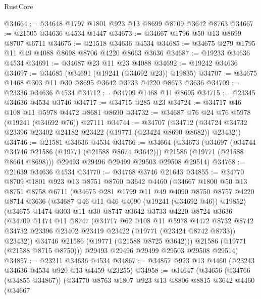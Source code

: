 \begin{lexlean}{RustCore}
\begin{coremodule}
@34664 := @34648 @1797 @1801 @923 @13 @8699 @8709 @3642 @8763
@34667 := @21505 @34636 @4534 @1447
@34673 := @34667 @1796 @50 @13 @8699 @8707 @6711
@34675 := @21518 @34636 @4534
@34685 := @34675 @279 @1795 @11 @49 @4088 @8698 @8706 @4220 @8663 @3636
@34687 := @19233 @34636 @4534
@34691 := @34687 @23 @11 @23 @4088
@34692 := @19242 @34636
@34697 := @34685 (@34691 (@19241 (@34692 @23)) @19835)
@34707 := @34675 @1468 @303 @11 @30 @8695 @3642 @3733 @4220 @8673 @3636
@34709 := @23336 @34636 @4534
@34712 := @34709 @1468 @11 @8695
@34715 := @23345 @34636 @4534 @3746
@34717 := @34715 @285 @23
@34724 := @34717 @46 @108 @11 @5978 @4472 @8681 @8690
@34732 := @34687 @76 @24 @76 @5978 (@19241 (@34692 @76)) @27111
@34744 := @34707
    (@34712 (@34724 @34732 @23396 @23402 @24182 @23422 (@19771 (@23424 @8690 @8682)) @23432))
@34746 := @21581 @34636 @4534
@34766 := @34664
    (@34673
      (@34697
        (@34744 @34746 @21586 (@19771 (@21588 @8674 @3642)))
        @21586
        (@19771 (@21588 @8664 @8698)))
      @29493
      @29496
      @29499
      @29503
      @29508
      @29514)
@34768 := @21639 @34636 @4534
@34770 := @34768 @3746 @21643
@34855 := @34770
    @8709
    @1801
    @923
    @13
    @8751
    @8760
    @3642
    @4460
    (@34667
      @1800
      @50
      @13
      @8751
      @8758
      @6711
      (@34675
        @281
        @1799
        @11
        @49
        @4090
        @8750
        @8757
        @4220
        @8714
        @3636
        (@34687 @46 @11 @46 @4090 (@19241 (@34692 @46)) @19852)
        (@34675
          @1474
          @303
          @11
          @30
          @8747
          @3642
          @3733
          @4220
          @8724
          @3636
          (@34709
            @1474
            @11
            @8747
            (@34717
              @62
              @108
              @11
              @5978
              @4472
              @8732
              @8742
              @34732
              @23396
              @23402
              @23419
              @23422
              (@19771 (@23424 @8742 @8733))
              @23432))
          @34746
          @21586
          (@19771 (@21588 @8725 @3642)))
        @21586
        (@19771 (@21588 @8715 @8750)))
      @29493
      @29496
      @29499
      @29503
      @29508
      @29514)
@34857 := @23211 @34636 @4534
@34867 := @34857 @923 @13 @4460 (@23243 @34636 @4534 @920 @13 @4459 @23255)
@34958 := @34647
    (@34656
      (@34766 (@34855 @34867))
      (@34770
        @8763
        @1807
        @923
        @13
        @8806
        @8815
        @3642
        @4460
        (@34667

\end{coremodule}
\end{lexlean}
